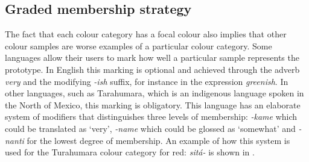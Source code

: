 \subsection{Graded membership strategy}

The fact that each colour category has a focal colour also
implies that other colour samples are worse examples of a particular
colour category. Some languages allow their users to mark how well a
particular sample represents the prototype. In English this marking is
optional and achieved through the adverb \textit{very} and the modifying
\textit{-ish} suffix, for instance in the expression \textit{greenish}. In other
languages, such as Tarahumara, which is an indigenous language spoken
in the North of Mexico, this marking is obligatory. This language has
an elaborate system of modifiers that distinguishes three levels of
membership: \textit{-kame} which could be translated as `very', \textit{-name}
which could be glossed as `somewhat' and \textit{-nanti} for the lowest
degree of membership. An example of how this system is used for the
Turahumara colour category for red: \textit{sit\'a-} is shown in  \citep{burgress83tarahumara}.

